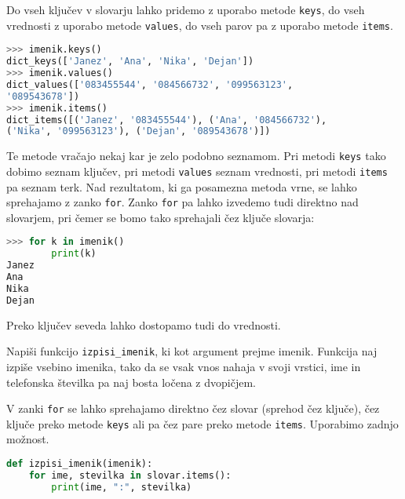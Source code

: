 Do vseh ključev v slovarju lahko pridemo z uporabo metode \texttt{keys}, do vseh vrednosti z uporabo metode \texttt{values}, do vseh parov pa z uporabo metode \texttt{items}. 
\begin{lstlisting}[language=Python]
>>> imenik.keys()
dict_keys(['Janez', 'Ana', 'Nika', 'Dejan'])
>>> imenik.values()
dict_values(['083455544', '084566732', '099563123', 
'089543678'])
>>> imenik.items()
dict_items([('Janez', '083455544'), ('Ana', '084566732'), 
('Nika', '099563123'), ('Dejan', '089543678')])
\end{lstlisting}
Te metode vračajo nekaj kar je zelo podobno seznamom. Pri metodi \texttt{keys} tako dobimo seznam ključev, pri metodi \texttt{values} seznam vrednosti, pri metodi \texttt{items} pa seznam terk. Nad rezultatom, ki ga posamezna metoda vrne, se lahko sprehajamo z zanko \texttt{for}. Zanko \texttt{for} pa lahko izvedemo tudi direktno nad slovarjem, pri čemer se bomo tako sprehajali čez ključe slovarja:
\begin{lstlisting}[language=Python]
>>> for k in imenik()
        print(k)
Janez
Ana
Nika
Dejan
\end{lstlisting}
Preko ključev seveda lahko dostopamo tudi do vrednosti. 
\begin{zgled}
Napiši funkcijo \texttt{izpisi\_imenik}, ki kot argument prejme imenik. Funkcija naj izpiše vsebino imenika, tako da se vsak vnos nahaja v svoji vrstici, ime in telefonska številka pa naj bosta ločena z dvopičjem.
\end{zgled}
\begin{resitev}
V zanki \texttt{for} se lahko sprehajamo direktno čez slovar (sprehod čez ključe), čez ključe preko metode \texttt{keys} ali pa čez pare preko metode \texttt{items}. Uporabimo zadnjo možnost.
\begin{lstlisting}[language=Python]
def izpisi_imenik(imenik):
    for ime, stevilka in slovar.items():
        print(ime, ":", stevilka)   
\end{lstlisting}
\end{resitev}

